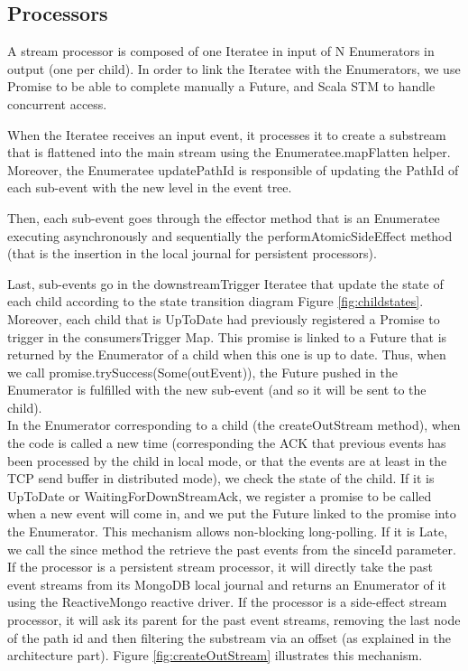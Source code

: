 \subsection{Processors}

A stream processor is composed of one Iteratee in input of N Enumerators in output (one per child). 
In order to link the Iteratee with the Enumerators, we use Promise to be able to complete manually a Future, and Scala STM to handle concurrent access. 

When the Iteratee receives an input event, it processes it to create a substream that is flattened into the main stream using the Enumeratee.mapFlatten helper. Moreover, the Enumeratee updatePathId is responsible of updating the PathId of each sub-event with the new level in the event tree.

Then, each sub-event goes through the effector method that is an Enumeratee executing asynchronously and sequentially the performAtomicSideEffect method (that is the insertion
in the local journal for persistent processors). 

Last, sub-events go in the downstreamTrigger Iteratee that update the state of each child according to the state transition diagram Figure \ref{fig:childstates}. Moreover, each
child that is UpToDate had previously registered a Promise to trigger in the consumersTrigger Map. This promise is linked to a Future that is returned by the Enumerator of a child
when this one is up to date. Thus, when we call promise.trySuccess(Some(outEvent)), the Future pushed in the Enumerator is fulfilled with the new sub-event (and so it will be sent
to the child).
\\

In the Enumerator corresponding to a child (the createOutStream method), when the code is called a new time (corresponding the ACK that previous events has been processed by the child in local mode,
or that the events are at least in the TCP send buffer in distributed mode), we check the state of the child. If it is UpToDate or WaitingForDownStreamAck, we register
a promise to be called when a new event will come in, and we put the Future linked to the promise into the Enumerator. This mechanism allows non-blocking long-polling.
If it is Late, we call the since method the retrieve the past events from the sinceId parameter. If the processor is a persistent stream processor,
it will directly take the past event streams from its MongoDB local journal and returns an Enumerator of it using the ReactiveMongo reactive driver. If the processor is
a side-effect stream processor, it will ask its parent for the past event streams, removing the last node of the path id and then filtering the substream via an offset (as explained in the architecture part). 
Figure \ref{fig:createOutStream} illustrates this mechanism. 

